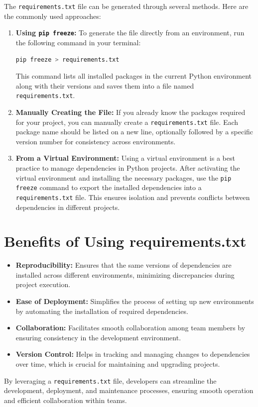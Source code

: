 The \texttt{requirements.txt} file can be generated through several methods. Here are the commonly used approaches:

\begin{enumerate}
	\item \textbf{Using \texttt{pip freeze}:} To generate the file directly from an environment, run the following command in your terminal:
	\begin{lstlisting}[language=bash]
		pip freeze > requirements.txt
	\end{lstlisting}
	This command lists all installed packages in the current Python environment along with their versions and saves them into a file named \texttt{requirements.txt}.
	
	\item \textbf{Manually Creating the File:} If you already know the packages required for your project, you can manually create a \texttt{requirements.txt} file. Each package name should be listed on a new line, optionally followed by a specific version number for consistency across environments.
	
	\item \textbf{From a Virtual Environment:} Using a virtual environment is a best practice to manage dependencies in Python projects. After activating the virtual environment and installing the necessary packages, use the \texttt{pip freeze} command to export the installed dependencies into a \texttt{requirements.txt} file. This ensures isolation and prevents conflicts between dependencies in different projects.
\end{enumerate}

\section{Benefits of Using requirements.txt}

\begin{itemize}
	\item \textbf{Reproducibility:} Ensures that the same versions of dependencies are installed across different environments, minimizing discrepancies during project execution.
	\item \textbf{Ease of Deployment:} Simplifies the process of setting up new environments by automating the installation of required dependencies.
	\item \textbf{Collaboration:} Facilitates smooth collaboration among team members by ensuring consistency in the development environment.
	\item \textbf{Version Control:} Helps in tracking and managing changes to dependencies over time, which is crucial for maintaining and upgrading projects.
\end{itemize}

By leveraging a \texttt{requirements.txt} file, developers can streamline the development, deployment, and maintenance processes, ensuring smooth operation and efficient collaboration within teams.
